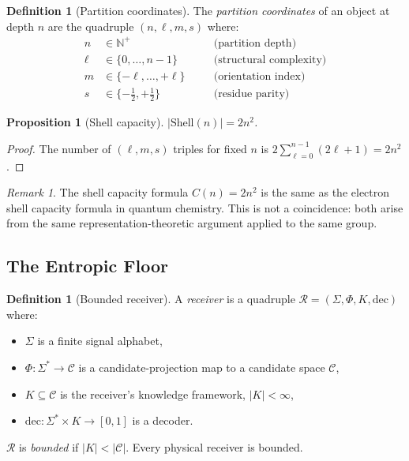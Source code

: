 \documentclass[twocolumn,11pt,a4paper]{article}
\newtheorem{proposition}[theorem]{Proposition}
\theoremstyle{definition}
\newtheorem{definition}[theorem]{Definition}
\theoremstyle{remark}
\newtheorem{remark}[theorem]{Remark}
\newcommand{\Recv}{\mathcal{R}}
\begin{document}
\begin{definition}[Partition coordinates]
\label{def:partcoord}
The \emph{partition coordinates} of an object at depth $n$ are the
quadruple $(n, \ell, m, s)$ where:
\begin{align*}
n &\in \mathbb{N}^+ &\quad& \text{(partition depth)}\\
\ell &\in \{0,\ldots,n-1\} && \text{(structural complexity)}\\
m &\in \{-\ell,\ldots,+\ell\} && \text{(orientation index)}\\
s &\in \{-\tfrac{1}{2},+\tfrac{1}{2}\} && \text{(residue parity)}
\end{align*}
\end{definition}

\begin{proposition}[Shell capacity]
\label{prop:shell}
$|\mathrm{Shell}(n)| = 2n^2$.
\end{proposition}
\begin{proof}
The number of $(\ell, m, s)$ triples for fixed $n$ is
$2 \sum_{\ell=0}^{n-1}(2\ell+1) = 2n^2$.
\end{proof}

\begin{remark}
The shell capacity formula $C(n) = 2n^2$ is the same as the electron
shell capacity formula in quantum chemistry.  This is not a coincidence:
both arise from the same representation-theoretic argument applied to
the same group.
\end{remark}

\subsection{The Entropic Floor}
\label{sec:floor}

\begin{definition}[Bounded receiver]
\label{def:receiver}
A \emph{receiver} is a quadruple $\Recv = (\Sigma, \Phi, K,
\mathrm{dec})$ where:
\begin{itemize}[noitemsep,topsep=1pt]
\item $\Sigma$ is a finite signal alphabet,
\item $\Phi : \Sigma^* \to \mathscr{C}$ is a candidate-projection map
  to a candidate space $\mathscr{C}$,
\item $K \subseteq \mathscr{C}$ is the receiver's knowledge framework,
  $|K| < \infty$,
\item $\mathrm{dec} : \Sigma^* \times K \to [0,1]$ is a decoder.
\end{itemize}
$\Recv$ is \emph{bounded} if $|K| < |\mathscr{C}|$.  Every physical
receiver is bounded.
\end{definition}
\end{document}
